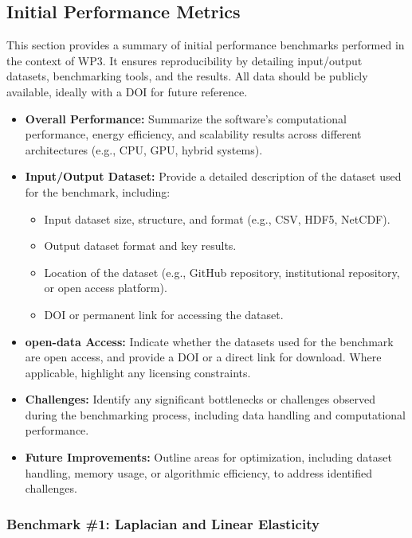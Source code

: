 \subsection{Initial Performance Metrics}
\label{sec:WP3:Feelpp:metrics}

This section provides a summary of initial performance benchmarks performed in the context of WP3. It ensures reproducibility by detailing input/output datasets, benchmarking tools, and the results. All data should be publicly available, ideally with a DOI for future reference.

\iffalse
\begin{itemize}
    \item \textbf{Overall Performance:} Summarize the software's computational performance, energy efficiency, and scalability results across different architectures (e.g., CPU, GPU, hybrid systems).
    \item \textbf{Input/Output Dataset:} Provide a detailed description of the dataset used for the benchmark, including:
        \begin{itemize}
            \item Input dataset size, structure, and format (e.g., CSV, HDF5, NetCDF).
            \item Output dataset format and key results.
            \item Location of the dataset (e.g., GitHub repository, institutional repository, or open access platform).
            \item DOI or permanent link for accessing the dataset.
        \end{itemize}
    \item \textbf{open-data Access:} Indicate whether the datasets used for the benchmark are open access, and provide a DOI or a direct link for download. Where applicable, highlight any licensing constraints.
    \item \textbf{Challenges:} Identify any significant bottlenecks or challenges observed during the benchmarking process, including data handling and computational performance.
    \item \textbf{Future Improvements:} Outline areas for optimization, including dataset handling, memory usage, or algorithmic efficiency, to address identified challenges.
\end{itemize}

\subsubsection{Benchmark \#1: Laplacian and Linear Elasticity}
